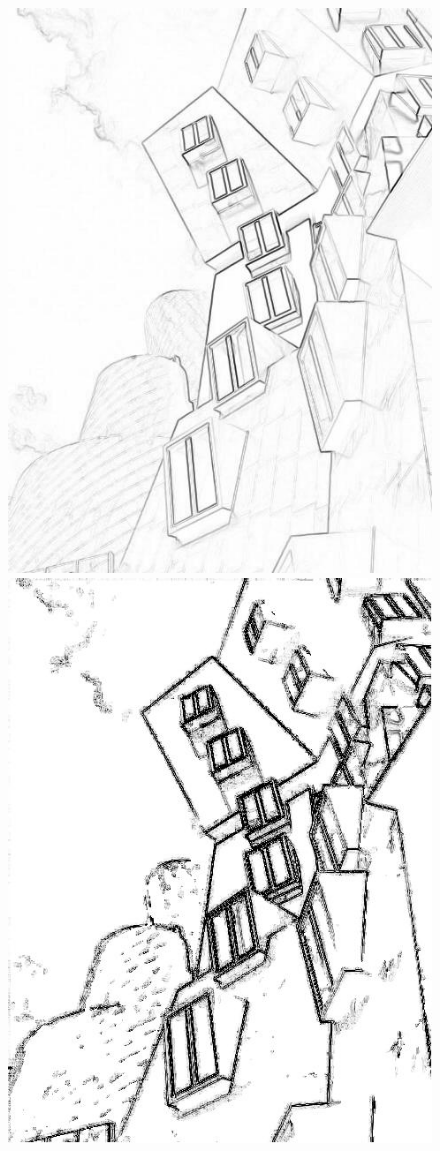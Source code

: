 \documentclass[12pt]{amsart}
\begin{document}
\begin{figure}
\includegraphics[width=\linewidth]{stata_center_gradient_edges.jpg}
\endminipage\hfill
{}%
\includegraphics[width=\linewidth]{stata_center_laplacian_edges.jpg}

\end{figure}
\end{document}
